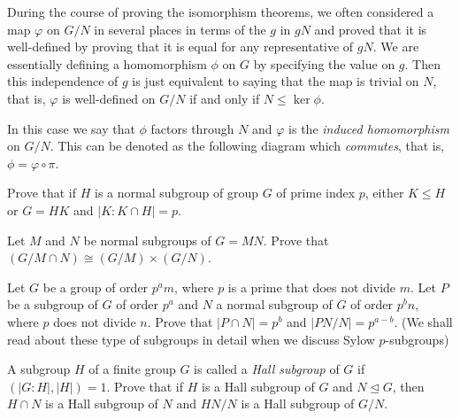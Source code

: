 During the course of proving the isomorphism theorems, we often considered a map $\varphi$ on $G/N$ in several places in terms of the $g$ in $gN$ and proved that it is well-defined by proving that it is equal for any representative of $gN$. We are essentially defining a homomorphism $\phi$ on $G$ by specifying the value on $g$. Then this independence of $g$ is just equivalent to saying that the map is trivial on $N$, that is, $\varphi$ is well-defined on $G/N$ if and only if $N\leq\ker\phi$.

In this case we say that $\phi$ factors through $N$ and $\varphi$ is the \textit{induced homomorphism} on $G/N$. This can be denoted as the following diagram which \textit{commutes}, that is, $\phi=\varphi\circ\pi$.
\begin{center}
\end{center}

\begin{exercise}
    Prove that if $H$ is a normal subgroup of group $G$ of prime index $p$, either $K\leq H$ or $G=HK$ and $|K:K\cap H|=p$.
\end{exercise}

\begin{exercise}
    Let $M$ and $N$ be normal subgroups of $G=MN$. Prove that $(G/M\cap N)\cong (G/M)\times (G/N)$.
\end{exercise}

\begin{exercise}
    Let $G$ be a group of order $p^a m$, where $p$ is a prime that does not divide $m$. Let $P$ be a subgroup of $G$ of order $p^a$ and $N$ a normal subgroup of $G$ of order $p^bn$, where $p$ does not divide $n$. Prove that $|P\cap N|=p^b$ and $|PN/N|=p^{a-b}$. (We shall read about these type of subgroups in detail when we discuss Sylow $p$-subgroups)
\end{exercise}

\begin{exercise}
    A subgroup $H$ of a finite group $G$ is called a \textit{Hall subgroup} of $G$ if $(|G:H|,|H|)=1$. Prove that if $H$ is a Hall subgroup of $G$ and $N\unlhd G$, then $H\cap N$ is a Hall subgroup of $N$ and $HN/N$ is a Hall subgroup of $G/N$.
\end{exercise}

\clearpage
